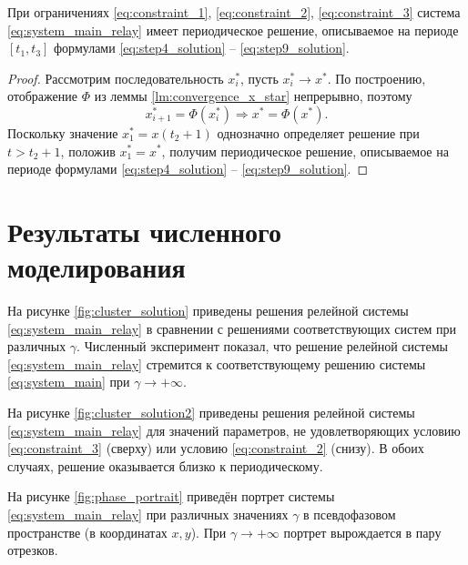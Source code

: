 \begin{theorem}
	\label{thm:periodic_relay_existence}
	При ограничениях \eqref{eq:constraint_1}, \eqref{eq:constraint_2}, \eqref{eq:constraint_3} система \eqref{eq:system_main_relay} имеет периодическое решение, описываемое на периоде $[t_1, t_3]$ формулами \eqref{eq:step4_solution} -- \eqref{eq:step9_solution}.
\end{theorem}
\begin{proof}
	Рассмотрим последовательность $x^*_i$, пусть $x^*_i \to x^*$. По построению, отображение $\Phi$ из леммы \ref{lm:convergence_x_star} непрерывно, поэтому
	\[
	x^*_{i + 1} = \Phi(x^*_i) \Rightarrow x^* = \Phi(x^*).
	\]
	Поскольку значение $x^*_1 = x(t_2 + 1)$ однозначно определяет решение при $t > t_2 + 1$, положив $x^*_1 = x^*$, получим периодическое решение, описываемое на периоде формулами \eqref{eq:step4_solution} -- \eqref{eq:step9_solution}.
\end{proof}

\section{Результаты численного моделирования}\label{sec:ch3/sect5}

На рисунке \ref{fig:cluster_solution} приведены решения релейной системы \eqref{eq:system_main_relay} в сравнении с решениями соответствующих систем при различных $\gamma$. Численный эксперимент показал, что решение релейной системы \eqref{eq:system_main_relay} стремится к соответствующему решению системы \eqref{eq:system_main} при $\gamma \to +\infty$.

На рисунке \ref{fig:cluster_solution2} приведены решения релейной системы \eqref{eq:system_main_relay} для значений параметров, не удовлетворяющих условию \eqref{eq:constraint_3} (сверху) или условию \eqref{eq:constraint_2} (снизу). В обоих случаях, решение оказывается близко к периодическому.


На рисунке \ref{fig:phase_portrait} приведён портрет системы \eqref{eq:system_main_relay} при различных значениях $\gamma$ в псевдофазовом пространстве (в координатах $x, y$). При $\gamma \to +\infty$ портрет вырождается в пару отрезков.

